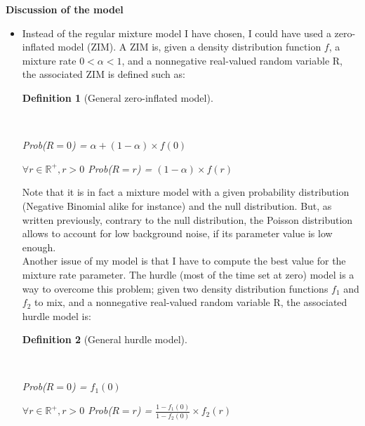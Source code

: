 \documentclass{report}
\newtheorem{definition}{Definition}[section]
\begin{document}
{\bigskip
\noindent \textbf{Discussion of the model}
\bigskip

\begin{itemize}

\item Instead of the regular mixture model I have chosen, I could have used a zero-inflated model (ZIM)\cite{rodriguez2013models}. A ZIM is, given a density distribution function $f$, a mixture rate $0 < \alpha < 1$, and a nonnegative real-valued random variable R, the associated ZIM is defined such as:

\begin{definition}[General zero-inflated model]\label{zeroinflated}{ ~\\
\begin{center} \textit{Prob}($R = 0$) = $\alpha + (1-\alpha) \times f(0)$ \end{center}
\begin{center} $\forall r \in \mathbb{R}^+, r > 0$ \textit{Prob}($R = r$) = $(1-\alpha) \times f(r)$ \end{center}
}\end{definition}

Note that it is in fact a mixture model with a given probability distribution (Negative Binomial alike for instance) and the null distribution. But, as written previously, contrary to the null distribution, the Poisson distribution allows to account for low background noise\cite{kharchenko2014bayesian}, if its parameter value is low enough.\\

Another issue of my model is that I have to compute the best value for the mixture rate parameter. The hurdle (most of the time set at zero) model is a way to overcome this problem; given two density distribution functions $f_1$ and $f_2$ to mix, and a nonnegative real-valued random variable R, the associated hurdle model is\cite{arnold2009advances}:

\begin{definition}[General hurdle model]\label{hurdlemodel}{ ~\\

\begin{center} \textit{Prob}($R = 0$) = $f_1(0)$ \end{center}
\begin{center} $\forall r \in \mathbb{R}^+, r > 0$ \textit{Prob}($R = r$) = $\frac{1-f_1(0)}{1-f_2(0)} \times f_2(r)$ \end{center}
}\end{definition}


\end{itemize}}
\end{document}
